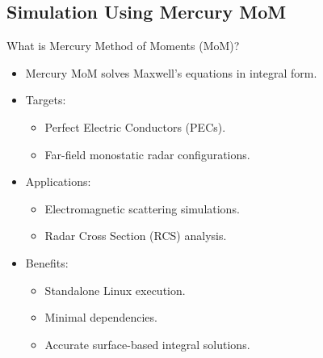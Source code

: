 \subsection{Simulation Using Mercury MoM}
\begin{frame}{What is Mercury Method of Moments (MoM)?}
    \begin{itemize}
        \item Mercury MoM solves Maxwell's equations in integral form.
        \item Targets: 
            \begin{itemize}
                \item Perfect Electric Conductors (PECs).
                \item Far-field monostatic radar configurations.
            \end{itemize}
        \item Applications:
            \begin{itemize}
                \item Electromagnetic scattering simulations.
                \item Radar Cross Section (RCS) analysis.
            \end{itemize}
        \item Benefits:
            \begin{itemize}
                \item Standalone Linux execution.
                \item Minimal dependencies.
                \item Accurate surface-based integral solutions.
            \end{itemize}
    \end{itemize}
\end{frame}


